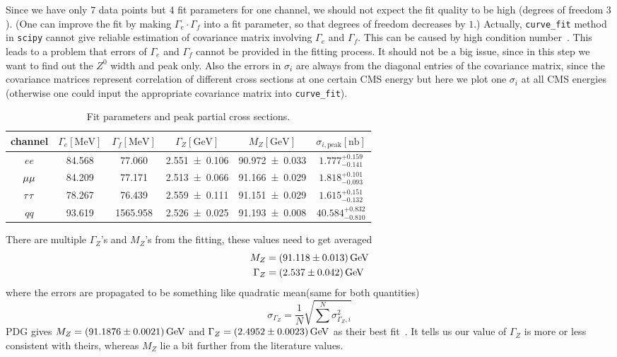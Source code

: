Since we have only $7$ data points but $4$ fit parameters for one channel, we should not expect the fit quality to be high (degrees of freedom $3$). (One can improve the fit by making $\Gamma_e \cdot \Gamma_f$ into a fit parameter, so that degrees of freedom decreases by $1$.) Actually, \verb|curve_fit| method in \verb|scipy| cannot give reliable estimation of covariance matrix involving $\Gamma_e$ and $\Gamma_f$. This can be caused by high condition number~\cite{stackoverflow}. This leads to a problem that errors of $\Gamma_e$ and $\Gamma_f$ cannot be provided in the fitting process. It should not be a big issue, since in this step we want to find out the $Z^0$ width and peak only. Also the errors in $\sigma_i$ are always from the diagonal entries of the covariance matrix, since the covariance matrices represent correlation of different cross sections at one certain CMS energy but here we plot one $\sigma_i$ at all CMS energies (otherwise one could input the appropriate covariance matrix into \verb|curve_fit|).

\begin{table}[ht]
\renewcommand{\arraystretch}{1.5}
	\centering
	\label{tab:label}
	\begin{tabular}{c | ccccc}
		\toprule
		channel & $\Gamma_e[\si{\mega\eV}]$ & $\Gamma_f[\si{\mega\eV}]$ & $\Gamma_Z[\si{\giga\eV}]$ & $M_Z[\si{\giga\eV}]$ & $\sigma_{i, \text{peak}}[\si{\nano\barn}]$\\
		\midrule 
		$ee$ & \num{84.568} & \num{77.060} & \num{2.551 +- 0.106} & \num{90.972 +- 0.033} & $1.777^{+0.159}_{-0.141}$\\
		$\mu\mu$ & \num{84.209} & \num{77.171} & \num{2.513 +- 0.066} & \num{91.166 +- 0.029} & $1.818^{+0.101}_{-0.093}$\\
		$\tau\tau$ & \num{78.267} & \num{76.439} & \num{2.559 +- 0.111} & \num{91.151 +- 0.029} & $1.615^{+0.151}_{-0.132}$ \\
		$qq$ & \num{93.619} & \num{1565.958} & \num{2.526 +- 0.025} & \num{91.193 +- 0.008} & $40.584^{+0.832}_{-0.810}$\\
		\bottomrule
	\end{tabular}
	\caption{Fit parameters and peak partial cross sections.}
\end{table}

There are multiple $\Gamma_Z$'s and $M_Z$'s from the fitting, these values need to get averaged
\begin{align}
	M_Z &= \SI{91.118 +- 0.013}{\giga\eV} \\
	\Gamma_Z &= \SI{2.537 +- 0.042}{\giga\eV}
\end{align}
where the errors are propagated to be something like quadratic mean(same for both quantities)
\begin{equation*}
	\sigma_{\Gamma_Z} = \frac{1}{N}\sqrt{\sum^N \sigma_{\Gamma_{Z}, i}^2} 
\end{equation*}
PDG gives $M_Z = \SI{91.1876 +- 0.0021}{\giga\eV}$ and $\Gamma_Z = \SI{2.4952 +- 0.0023}{\giga\eV}$ as their best fit~\cite{PDG}. It tells us our value of $\Gamma_Z$ is more or less consistent with theirs, whereas $M_Z$ lie a bit further from the literature values.


